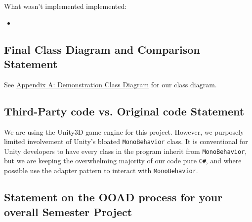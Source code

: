\documentclass[11pt]{amsart}
\begin{document}
What wasn't implemented implemented:
\begin{itemize}
    \item 
\end{itemize}



\subsection*{Final Class Diagram and Comparison Statement} \phantom{}





See \hyperref[sec:appendixa]{Appendix A: Demonstration Class Diagram} for our class diagram.

\subsection*{Third-Party code vs. Original code Statement} \phantom{}

We are using the Unity3D game engine for this project. However, we purposely limited involvement of Unity's bloated \texttt{MonoBehavior} class. It is conventional for Unity developers to have every class in the program inherit from \texttt{MonoBehavior}, but we are keeping the overwhelming majority of our code pure \texttt{C\#}, and where possible use the adapter pattern to interact with \texttt{MonoBehavior}. 

\subsection*{Statement on the OOAD process for your overall Semester Project} \phantom{}
\end{document}

